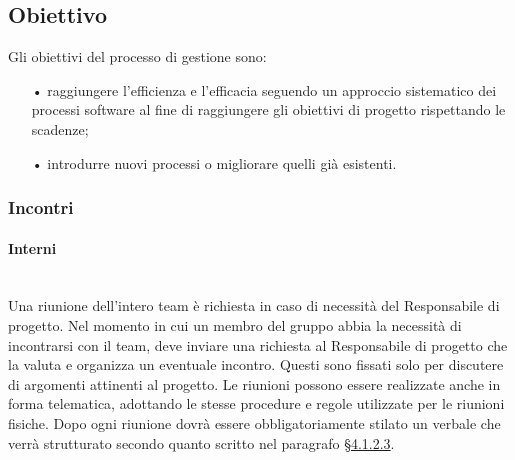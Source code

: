 \subsection{Obiettivo}
Gli obiettivi del processo di gestione sono:
\begin{itemize}
\item[•] raggiungere l’efficienza e l’efficacia seguendo un approccio sistematico dei processi software al fine di raggiungere gli obiettivi di progetto rispettando le scadenze;
\item[•] introdurre nuovi processi o migliorare quelli già esistenti.
\end{itemize}

\subsubsection{Incontri}

\paragraph{Interni}\mbox{}\\
\label{sec:interni}
Una riunione dell'intero team è richiesta in caso di necessità del Responsabile di progetto. Nel momento in cui un membro del gruppo abbia la necessità di incontrarsi con il team, deve inviare una richiesta al Responsabile di progetto che la valuta e organizza un eventuale incontro. Questi sono fissati solo per discutere di argomenti attinenti al progetto.
Le riunioni possono essere realizzate anche in forma {telematica}, adottando le stesse procedure e regole utilizzate per le riunioni fisiche.
Dopo ogni riunione dovrà essere obbligatoriamente stilato un verbale che verrà strutturato secondo quanto scritto nel paragrafo \hyperref[sec:verbali]{§4.1.2.3}.
